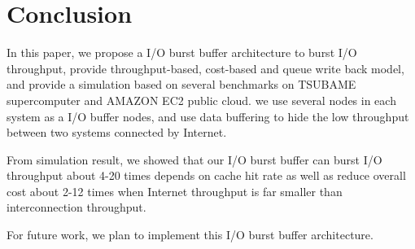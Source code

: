 \section{Conclusion}
\label{sec:conclusion}

In this paper, we propose a I/O burst buffer architecture to burst I/O throughput, provide throughput-based, cost-based and queue write back model, and provide a simulation based on several benchmarks on TSUBAME supercomputer and AMAZON EC2 public cloud.
we use several nodes in each system as a I/O buffer nodes, and use data buffering to hide the low throughput between two systems connected by Internet.

From simulation result, we showed that our I/O burst buffer can burst I/O throughput about 4-20 times depends on cache hit rate as well as reduce overall cost about 2-12 times when Internet throughput is far smaller than interconnection throughput.

For future work, we plan to implement this I/O burst buffer architecture.
